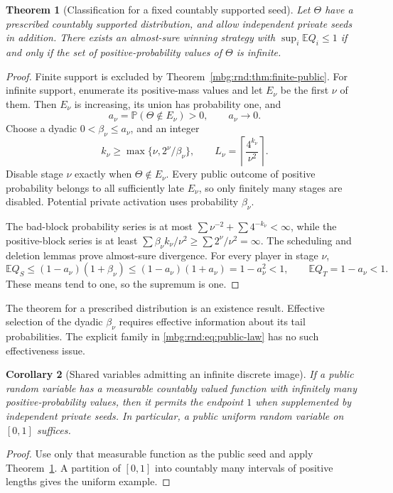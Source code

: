\documentclass[11pt,letterpaper]{article}
\newtheorem{theorem}{Theorem}[section]
\newtheorem{corollary}[theorem]{Corollary}
\theoremstyle{definition}
\newcommand{\E}{\mathbb E}
\newcommand{\Prb}{\mathbb P}
\begin{document}
\begin{theorem}[Classification for a fixed countably supported seed]
\label{mbg:rnd:thm:support}
Let $\Theta$ have a prescribed countably supported distribution, and allow
independent private seeds in addition. There exists an almost-sure
winning strategy with $\sup_i\E Q_i\le1$ if and only if the set of
positive-probability values of $\Theta$ is infinite.
\end{theorem}
\begin{proof}
Finite support is excluded by Theorem~\ref{mbg:rnd:thm:finite-public}. For infinite
support, enumerate its positive-mass values and let $E_\nu$ be the first
$\nu$ of them. Then $E_\nu$ is increasing, its union has probability one,
and
\[
 a_\nu=\Prb(\Theta\notin E_\nu)>0,\qquad a_\nu\longrightarrow0.
\]
Choose a dyadic $0<\beta_\nu\le a_\nu$, and an integer
\[
 k_\nu\ge\max\{\nu,2^\nu/\beta_\nu\},\qquad
 L_\nu=\left\lceil\frac{4^{k_\nu}}{\nu^2}\right\rceil.
\]
Disable stage $\nu$ exactly when $\Theta\notin E_\nu$. Every public outcome of
positive probability belongs to all sufficiently late $E_\nu$, so only
finitely many stages are disabled. Potential private activation uses
probability $\beta_\nu$.

The bad-block probability series is at most
$\sum \nu^{-2}+\sum4^{-k_\nu}<\infty$, while the positive-block series is
at least
$\sum\beta_\nu k_\nu/\nu^2\ge\sum2^\nu/\nu^2=\infty$.
The scheduling and deletion lemmas prove almost-sure divergence.
For every player in stage $\nu$,
\[
 \E Q_S\le(1-a_\nu)(1+\beta_\nu)
 \le(1-a_\nu)(1+a_\nu)=1-a_\nu^2<1,
 \qquad \E Q_T=1-a_\nu<1.
\]
These means tend to one, so the supremum is one.
\end{proof}

The theorem for a prescribed distribution is an existence result.
Effective selection of the dyadic $\beta_\nu$ requires effective
information about its tail probabilities. The explicit family in
\eqref{mbg:rnd:eq:public-law} has no such effectiveness issue.

\begin{corollary}[Shared variables admitting an infinite discrete image]
\label{mbg:rnd:cor:coarsening}
If a public random variable has a measurable countably valued function
with infinitely many positive-probability values, then it permits the
endpoint $1$ when supplemented by independent private seeds. In
particular, a public uniform random variable on $[0,1]$ suffices.
\end{corollary}
\begin{proof}
Use only that measurable function as the public seed and apply
Theorem~\ref{mbg:rnd:thm:support}. A partition of $[0,1]$ into countably many intervals
of positive lengths gives the uniform example.
\end{proof}
\end{document}
